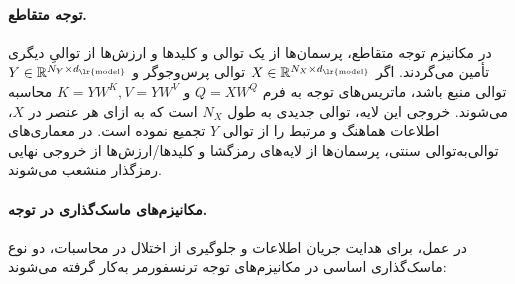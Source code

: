 \paragraph{توجه متقاطع.} در مکانیزم توجه متقاطع، پرسمان‌ها از یک توالی و کلیدها و ارزش‌ها از توالیِ دیگری تأمین می‌گردند. اگر $X \in \mathbb{R}^{N_X \times d_{\text{\lr{model}}}}$ توالی پرس‌وجوگر و $Y \in \mathbb{R}^{N_Y \times d_{\text{\lr{model}}}}$ توالی منبع باشد، ماتریس‌های توجه به فرم $Q = X W^Q$ و $K = Y W^K, V = Y W^V$ محاسبه می‌شوند. خروجی این لایه، توالی جدیدی به طول $N_X$ است که به ازای هر عنصر در $X$، اطلاعات هماهنگ و مرتبط را از توالی $Y$ تجمیع نموده است. در معماری‌های توالی‌به‌توالی سنتی، پرسمان‌ها از لایه‌های رمزگشا و کلیدها/ارزش‌ها از خروجی نهایی رمزگذار منشعب می‌شوند.

\paragraph{مکانیزم‌های ماسک‌گذاری در توجه.} در عمل، برای هدایت جریان اطلاعات و جلوگیری از اختلال در محاسبات، دو نوع ماسک‌گذاری اساسی در مکانیزم‌های توجه ترنسفورمر به‌کار گرفته می‌شوند:
